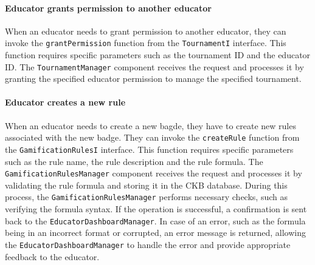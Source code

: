 \paragraph{Educator grants permission to another educator}
When an educator needs to grant permission to another educator, they can invoke the \verb|grantPermission| function from the \verb|TournamentI| interface. This function requires specific parameters such as the tournament ID and the educator ID.
The \verb|TournamentManager| component receives the request and processes it by granting the specified educator permission to manage the specified tournament.

\paragraph{Educator creates a new rule}
When an educator needs to create a new bagde, they have to create new rules associated with the new badge. They can invoke the \verb|createRule| function from the \verb|GamificationRulesI| interface.
This function requires specific parameters such as the rule name, the rule description and the rule formula. The \verb|GamificationRulesManager| component receives the request and processes it by validating the rule formula and storing it in the CKB database.
During this process, the \verb|GamificationRulesManager| performs necessary checks, such as verifying the formula syntax. If the operation is successful, a confirmation is sent back to the \verb|EducatorDashboardManager|.
In case of an error, such as the formula being in an incorrect format or corrupted, an error message is returned, allowing the \verb|EducatorDashboardManager| to handle the error and provide appropriate feedback to the educator.

